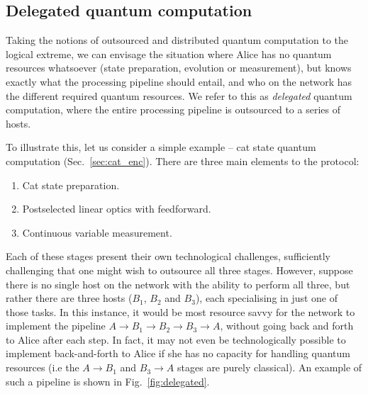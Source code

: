 \documentclass[aps,rmp,twocolumn,amsmath,amssymb,nofootinbib,superscriptaddress,longbibliography,floatfix]{revtex4-1}
\begin{document}
\subsection{Delegated quantum computation}

Taking the notions of outsourced and distributed quantum computation to the logical extreme, we can envisage the situation where Alice has no quantum resources whatsoever (state preparation, evolution or measurement), but knows exactly what the processing pipeline should entail, and who on the network has the different required quantum resources. We refer to this as \emph{delegated} quantum computation, where the entire processing pipeline is outsourced to a series of hosts.

To illustrate this, let us consider a simple example -- cat state quantum computation (Sec.~\ref{sec:cat_enc}). There are three main elements to the protocol:
\begin{enumerate}
\item Cat state preparation.
\item Postselected linear optics with feedforward.
\item Continuous variable measurement.
\end{enumerate}

Each of these stages present their own technological challenges, sufficiently challenging that one might wish to outsource all three stages. However, suppose there is no single host on the network with the ability to perform all three, but rather there are three hosts ($B_1$, $B_2$ and $B_3$), each specialising in just one of those tasks. In this instance, it would be most resource savvy for the network to implement the pipeline \mbox{$A\to B_1\to B_2\to B_3\to A$}, without going back and forth to Alice after each step. In fact, it may not even be technologically possible to implement back-and-forth to Alice if she has no capacity for handling quantum resources (i.e the \mbox{$A\to B_1$} and \mbox{$B_3\to A$} stages are purely classical). An example of such a pipeline is shown in Fig.~\ref{fig:delegated}.
\end{document}

